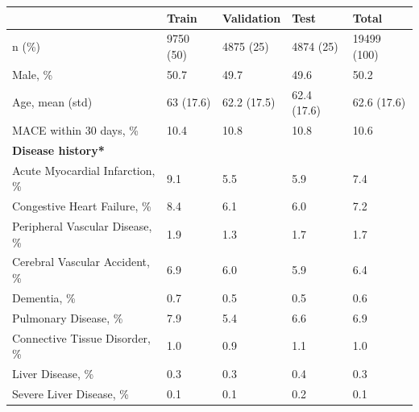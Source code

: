 \documentclass[preprint]{elsarticle}
\begin{document}
\begin{table}[]
\begin{tabular}{@{}lllll@{}}
                                                 & \textbf{Train} & \textbf{Validation} & \textbf{Test} & \textbf{Total} \\ \midrule
n (\%)                                           & 9750 (50)      & 4875 (25)           & 4874 (25)     & 19499 (100)    \\
Male, \%                                         & 50.7           & 49.7                & 49.6          & 50.2           \\
Age, mean (std)                                  & 63 (17.6)      & 62.2 (17.5)         & 62.4 (17.6)   & 62.6 (17.6)    \\
MACE within 30 days, \%                          & 10.4           & 10.8                & 10.8          & 10.6           \\
\textbf{Disease history*}                        &                &                     &               &                \\ %
Acute Myocardial Infarction, \%                  & 9.1            & 5.5                 & 5.9           & 7.4            \\
Congestive Heart Failure, \%                     & 8.4            & 6.1                 & 6.0           & 7.2            \\
Peripheral Vascular Disease, \%                  & 1.9            & 1.3                 & 1.7           & 1.7            \\
Cerebral Vascular Accident, \%                   & 6.9            & 6.0                 & 5.9           & 6.4            \\
Dementia, \%                                     & 0.7            & 0.5                 & 0.5           & 0.6            \\
Pulmonary Disease, \%                            & 7.9            & 5.4                 & 6.6           & 6.9            \\
Connective Tissue Disorder, \%                   & 1.0            & 0.9                 & 1.1           & 1.0            \\
Liver Disease, \%                                & 0.3            & 0.3                 & 0.4           & 0.3            \\
Severe Liver Disease, \%                         & 0.1            & 0.1                 & 0.2           & 0.1            \\

\end{tabular}
\end{table}
\end{document}
